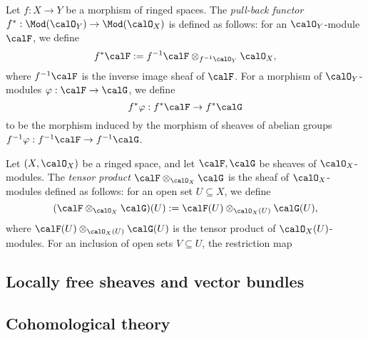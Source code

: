     \begin{definition}\label{def:pull_back_of_sheaves}
        Let \(f:X\to Y\) be a morphism of ringed spaces.
        The \emph{pull-back functor} \(f^*:\Mod(\calO_Y)\to \Mod(\calO_X)\) is defined as follows:
        for an \(\calO_Y\)-module \(\calF\), we define
        \[
            f^*\calF := f^{-1}\calF \otimes_{f^{-1}\calO_Y} \calO_X,
        \]
        where \(f^{-1}\calF\) is the inverse image sheaf of \(\calF\).
        For a morphism of \(\calO_Y\)-modules \(\varphi:\calF\to \calG\), we define
        \[
            f^*\varphi: f^*\calF \to f^*\calG
        \]
        to be the morphism induced by the morphism of sheaves of abelian groups \(f^{-1}\varphi:f^{-1}\calF \to f^{-1}\calG\).
    \end{definition}

    \begin{definition}\label{def:tensor_product_of_sheaves}
        Let \((X,\calO_X)\) be a ringed space, and let \(\calF,\calG\) be sheaves of \(\calO_X\)-modules.
        The \emph{tensor product} \(\calF \otimes_{\calO_X} \calG\) is the sheaf of \(\calO_X\)-modules defined as follows:
        for an open set \(U\subseteq X\), we define
        \[
            (\calF \otimes_{\calO_X} \calG)(U) := \calF(U) \otimes_{\calO_X(U)} \calG(U),
        \]
        where \(\calF(U) \otimes_{\calO_X(U)} \calG(U)\) is the tensor product of \(\calO_X(U)\)-modules.
        For an inclusion of open sets \(V\subseteq U\), the restriction map

    \end{definition}

    

\subsection{Locally free sheaves and vector bundles}

    

\subsection{Cohomological theory}

    